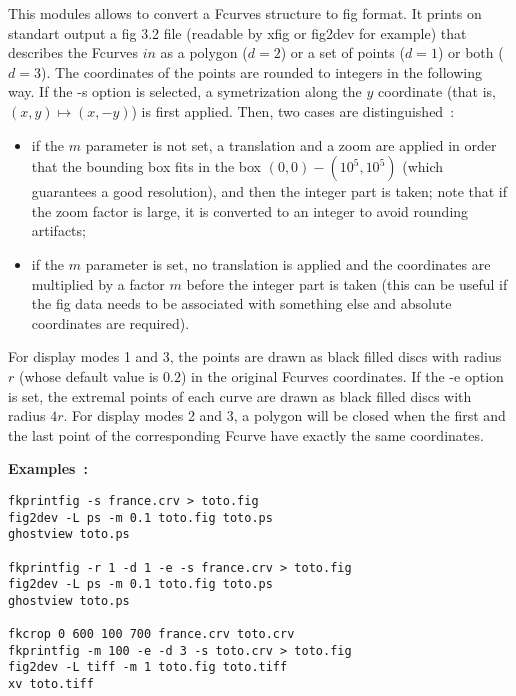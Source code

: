 This modules allows to convert a Fcurves structure to fig format.
It prints on standart output a fig 3.2 file (readable
by {\sf xfig} or {\sf fig2dev} for example) that describes the
Fcurves $in$ as a polygon ($d=2$) or a set of points ($d=1$) or both
($d=3$). The coordinates of the points are rounded to integers
in the following way. If the {\sf -s} option is selected,
a symetrization along the $y$ coordinate (that is, $(x,y)\mapsto (x,-y)$)
is first applied. Then, two cases are distinguished~:
\begin{itemize}
\item if the $m$ parameter is not set, a translation and a zoom
are applied in order that the bounding box fits in
the box $(0,0)-(10^5,10^5)$ (which guarantees a good resolution),
and then the integer part is taken;
note that if the zoom factor is large, it is converted to
an integer to avoid rounding artifacts;
\item if the $m$ parameter is set, no translation is applied and 
the coordinates are multiplied by a factor $m$ before 
the integer part is taken (this can be useful if the fig data needs 
to be associated with something else and absolute coordinates are required).
\end{itemize}
For display modes 1 and 3, the points are drawn as black filled discs
with radius $r$ (whose default value is $0.2$) in the original Fcurves 
coordinates. If the {\sf -e} option is set, the extremal points of
each curve are drawn as black filled discs with radius $4r$.
For display modes 2 and 3, a polygon will be closed when the 
first and the last point of the corresponding Fcurve have exactly
the same coordinates.


{\bf Examples~:}
\begin{verbatim}
fkprintfig -s france.crv > toto.fig
fig2dev -L ps -m 0.1 toto.fig toto.ps
ghostview toto.ps

fkprintfig -r 1 -d 1 -e -s france.crv > toto.fig
fig2dev -L ps -m 0.1 toto.fig toto.ps
ghostview toto.ps

fkcrop 0 600 100 700 france.crv toto.crv
fkprintfig -m 100 -e -d 3 -s toto.crv > toto.fig
fig2dev -L tiff -m 1 toto.fig toto.tiff
xv toto.tiff
\end{verbatim}
